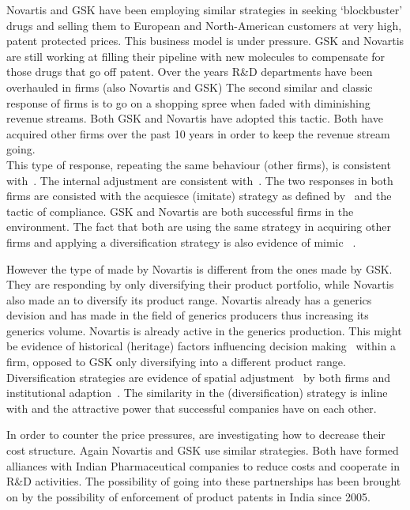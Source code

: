 Novartis and GSK have been employing similar strategies in seeking `blockbuster' drugs and selling them to European and North-American customers at very high, patent protected prices. 
This business model is under pressure.
GSK and Novartis are still working at filling their pipeline with new molecules to compensate for those drugs that go off patent.
Over the years R\&D departments have been overhauled in \pharma firms (also Novartis and GSK)
The second similar and classic response of \pharma firms is to go on a shopping spree when faded with diminishing revenue streams. 
Both GSK and Novartis have adopted this tactic.
Both have acquired other firms over the past 10 years in order to keep the revenue stream going.\\
This type of response, repeating the same behaviour (\acq other firms), is consistent with~\cite{Carney:2003un}.
The internal adjustment are consistent with~\cite{Cantwell:2009hg}.
The two responses in both firms are consisted with the acquiesce (imitate) strategy as defined by~\citep{Oliver:1997wj} and the tactic of compliance.
GSK and Novartis are both successful firms in the \pharma environment. 
The fact that both are using the same strategy in acquiring other firms and applying a diversification strategy is also evidence of mimic \iso~\citep{DiMaggio:1983wt, Westney:2005vv, Zucker:1987vn, Kostova:2008cs}.

However the type of \acq made by Novartis is different from the ones made by GSK\@.
They are responding by only diversifying their product portfolio, while Novartis also made an \acq to diversify its product range.
Novartis already has a generics devision and has made \acqs in the field of generics producers thus increasing its generics volume. 
Novartis is already active in the generics production.
This \acq might be evidence of historical (heritage) factors influencing decision making~\citep{Carney:2003un} within a firm, opposed to GSK only diversifying into a different product range.
Diversification strategies are evidence of spatial adjustment~\cite{Lawton:2009vw} by both firms and institutional adaption~\cite{Cantwell:2009hg}.
The similarity in the (diversification) strategy is inline with \iso and the attractive power that successful companies have on each other.

In order to counter the price pressures, \pharmas are investigating how to decrease their cost structure.
Again Novartis and GSK use similar strategies. 
Both have formed alliances with Indian Pharmaceutical companies to reduce costs and cooperate in R\&D activities.
The possibility of going into these partnerships has been brought on by the possibility of enforcement of product patents in India since 2005.


